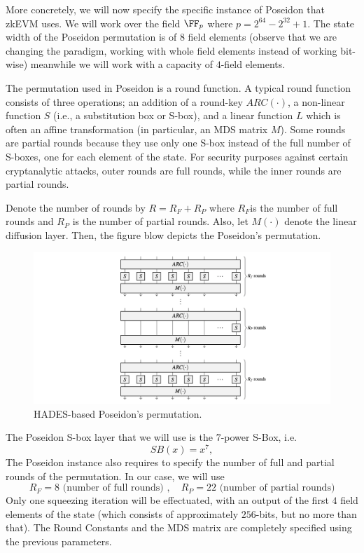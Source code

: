 More concretely, we will now specify the specific instance of Poseidon that zkEVM uses. We will work over the field $\FF_p$ where $p = 2^{64} - 2^{32} + 1$. The state width of the Poseidon permutation is of $8$ field elements (observe that we are changing the paradigm, working with whole field elements instead of working bit-wise) meanwhile we will work with a capacity of $4$-field elements. 

The permutation used in Poseidon is a round function. A typical round function consists of three operations; an addition of a round-key $ARC(\cdot)$, a non-linear function $S$ (i.e., a substitution box or S-box), and a linear function $L$ which is often an affine transformation (in particular, an MDS matrix $M$). Some rounds are partial rounds because they use only one S-box instead of the full number of S-boxes, one for each element of the state. For security purposes against certain cryptanalytic attacks, outer rounds are full rounds, while the inner rounds are partial rounds. 

Denote the number of rounds by $R=R_F+R_P$ where $R_F$​ is the number of full rounds and $R_P$ is the number of partial rounds. Also, let $M(\cdot)$ denote the linear diffusion layer. Then, the figure blow depicts the Poseidon's permutation. 

\begin{figure}[H]
    \centering
    \includegraphics[width=\columnwidth]{../figures/poseidon-hades}
    \caption{HADES-based Poseidon's permutation.}
    \label{fig:poseidon-hades}
\end{figure}

The Poseidon S-box layer that we will use is the $7$-power S-Box, i.e.
\[
SB(x) = x^7,
\]
The Poseidon instance also requires to specify the number of full and partial rounds of the permutation. In our case, we will use 
\[
R_F = 8 \text{ (number of full rounds) }, \quad R_P = 22 \text{ (number of partial rounds)}
\]
Only one squeezing iteration will be effectuated, with an output of the first $4$ field elements of the state (which consists of approximately $256$-bits, but no more than that). The Round Constants and the MDS matrix are completely specified using the previous parameters. 




